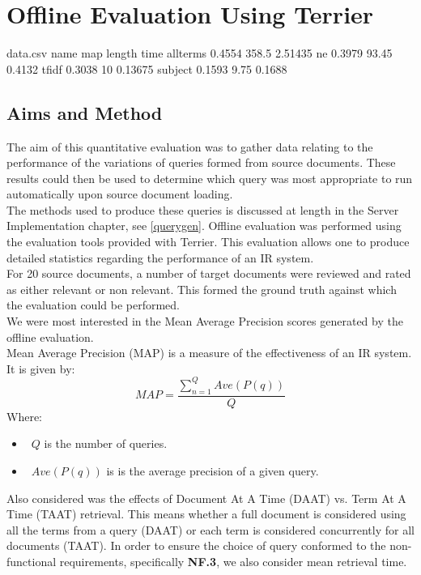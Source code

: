 \documentclass{l4proj}
\begin{document}
\section{Offline Evaluation Using Terrier}
\begin{filecontents*}{data.csv}
name map length time
allterms 0.4554  358.5  2.51435
ne 0.3979  93.45  0.4132
tfidf 0.3038  10  0.13675
subject 0.1593  9.75  0.1688
\end{filecontents*}
\subsection{Aims and Method}
The aim of this quantitative evaluation was to gather data relating to the performance of the variations of queries formed from source documents. These results could then be used to determine which query was most appropriate to run automatically upon source document loading. \\
The methods used to produce these queries is discussed at length in the Server Implementation chapter, see \ref{querygen}.
Offline evaluation was performed using the evaluation tools provided with Terrier. This evaluation allows one to produce detailed statistics regarding the performance of an IR system.\\
For 20 source documents, a number of target documents were reviewed and rated as either relevant or non relevant. This formed the ground truth against which the evaluation could be performed.\\
We were most interested in the Mean Average Precision scores generated by the offline evaluation.\\
Mean Average Precision (MAP) is a measure of the effectiveness of an IR system.
It is given by:
\begin{displaymath}
  MAP=\frac{\sum_{n=1}^{Q} Ave(P(q))}{Q}
\end{displaymath}
Where: 
\begin{itemize}
\item{~$Q$ is the number of queries.}
\item{~$Ave(P(q))$ is is the average precision of a given query.}
\end{itemize}

Also considered was the effects of Document At A Time (DAAT) vs. Term At A Time (TAAT) retrieval. This means whether a full document is considered using all the terms from a query (DAAT) or each term is considered concurrently for all documents (TAAT). In order to ensure the choice of query conformed to the non-functional requirements, specifically \textbf{NF.3}, we also consider mean retrieval time.
\end{document}
